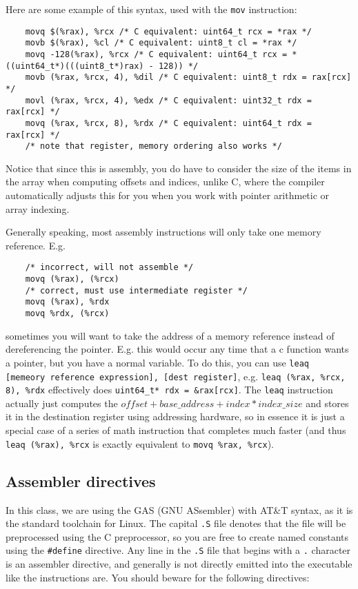 \documentclass[11pt]{article}
\begin{document}
Here are some example of this syntax, used with the \texttt{mov} instruction:

\begin{lstlisting}
    movq $(%rax), %rcx /* C equivalent: uint64_t rcx = *rax */
    movb $(%rax), %cl /* C equivalent: uint8_t cl = *rax */
    movq -128(%rax), %rcx /* C equivalent: uint64_t rcx = *((uint64_t*)(((uint8_t*)rax) - 128)) */
    movb (%rax, %rcx, 4), %dil /* C equivalent: uint8_t rdx = rax[rcx] */
    movl (%rax, %rcx, 4), %edx /* C equivalent: uint32_t rdx = rax[rcx] */
    movq (%rax, %rcx, 8), %rdx /* C equivalent: uint64_t rdx = rax[rcx] */
    /* note that register, memory ordering also works */
\end{lstlisting}

Notice that since this is assembly, you do have to consider the size of the items in the
array when computing offsets and indices, unlike C, where the compiler automatically
adjusts this for you when you work with pointer arithmetic or array indexing.

Generally speaking, most assembly instructions will only take one memory reference. E.g.

\begin{lstlisting}
    /* incorrect, will not assemble */
    movq (%rax), (%rcx)
    /* correct, must use intermediate register */
    movq (%rax), %rdx
    movq %rdx, (%rcx)
\end{lstlisting}

sometimes you will want to take the address of a memory reference instead of dereferencing
the pointer. E.g. this would occur any time that a c function wants a pointer, but you
have a normal variable. To do this, you can use \texttt{leaq [memeory reference
expression], [dest register]}, e.g. \texttt{leaq (\%rax, \%rcx, 8), \%rdx} effectively
does \texttt{uint64\_t* rdx = \&rax[rcx]}. The \texttt{leaq} instruction actually just
computes the $offset + base\_address + index * index\_size$ and stores it in the
destination register using addressing hardware, so in essence it is just a special case
of a series of math instruction that completes much faster (and thus \texttt{leaq (\%rax),
\%rcx} is exactly equivalent to \texttt{movq \%rax, \%rcx}).

\subsection{Assembler directives}

In this class, we are using the GAS (GNU ASsembler) with AT\&T syntax, as it is the
standard toolchain for Linux. The capital \texttt{.S} file denotes that the file will be
preprocessed using the C preprocessor, so you are free to create named constants using the
\texttt{\#define} directive. Any line in the \texttt{.S} file that begins with a \texttt{.}
character is an assembler directive, and generally is not directly emitted into the
executable like the instructions are. You should beware for the following directives:
\end{document}

